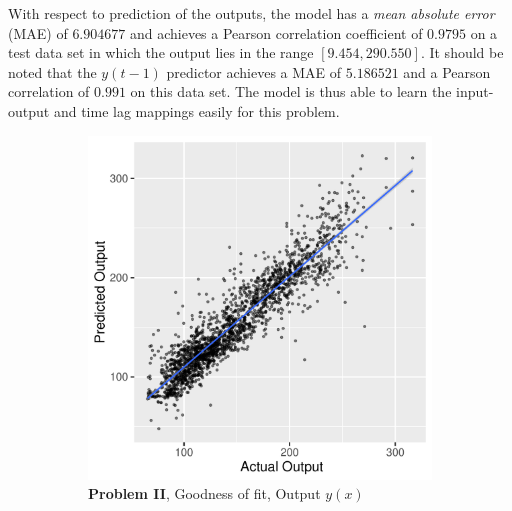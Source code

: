 \documentclass[envcountsect,runningheads]{llncs}
\theoremstyle{etoile}
\begin{document}
With respect to prediction of the outputs, the model has a \emph{mean absolute error} (MAE) of 
$6.904677$ and achieves a Pearson correlation coefficient of $0.9795$ on a test data set in which the 
output lies in the range $[9.454, 290.550]$. It should be noted that the $y(t - 1)$ predictor 
achieves a MAE of $5.186521$ and a Pearson correlation of $0.991$ on this data set. The model is 
thus able to learn the input-output and time lag mappings easily for this problem.


\begin{figure}
  \centering

  \begin{subfigure}[b]{0.4\textwidth}
    \centering
    \includegraphics[width=\textwidth]{figures/exp2_scatter_v_test}
    \caption{ \textbf{Problem II}, Goodness of fit, Output $y(x)$}
    \label{fig:problem2_fitv}
  \end{subfigure}
  \hfill
  \begin{subfigure}[b]{0.4\textwidth}
    \centering

\end{subfigure}
\end{figure}
\end{document}
